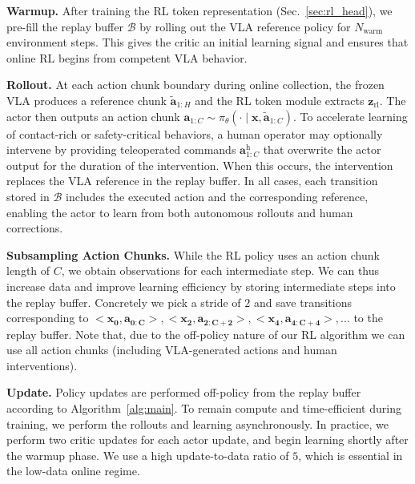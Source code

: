 \textbf{Warmup.} After training the RL token representation (Sec.~\ref{sec:rl_head}), we pre-fill the replay buffer $\mathcal{B}$  by rolling out the VLA reference policy for $N_{\text{warm}}$ environment steps. This gives the critic an initial learning signal and ensures that online RL begins from competent VLA behavior.

\textbf{Rollout.} At each action chunk boundary during online collection, the frozen VLA produces a reference chunk $\tilde{\mathbf{a}}_{1:H}$ and the RL token module extracts $\mathbf{z}_{\text{rl}}$. The actor then outputs an action chunk $\mathbf{a}_{1:C} \sim \pi_\theta(\cdot \mid \mathbf{x}, \tilde{\mathbf{a}}_{1:C})$.
To accelerate learning of contact-rich or safety-critical behaviors, a human operator may optionally intervene by providing teleoperated commands $\mathbf{a}^{\text{h}}_{1:C}$ that overwrite the actor output for the duration of the intervention. When this occurs, the intervention replaces the VLA reference in the replay buffer. In all cases, each transition stored in $\mathcal{B}$ includes the executed action and the corresponding reference, enabling the actor to learn from both autonomous rollouts and human corrections.


\textbf{Subsampling Action Chunks.} While the RL policy uses an action chunk length of $C$, we obtain observations for each intermediate step. We can thus increase data and improve learning efficiency by storing intermediate steps into the replay buffer. Concretely we pick a stride of $2$ and save transitions corresponding to $<\mathbf{x_0}, \mathbf{a_{0:C}}>, <\mathbf{x_2}, \mathbf{a_{2:C+2}}>, <\mathbf{x_4}, \mathbf{a_{4:C+4}}>, \dots$ to the replay buffer. Note that, due to the off-policy nature of our RL algorithm we can use all action chunks (including VLA-generated actions and human interventions).

\textbf{Update.} Policy updates are performed off-policy from the replay buffer according to Algorithm~\ref{alg:main}. To remain compute and time-efficient during training, we perform the rollouts and learning asynchronously. In practice, we perform two critic updates for each actor update, and begin learning shortly after the warmup phase. We use a high update-to-data ratio of $5$, which is essential in the low-data online regime.

